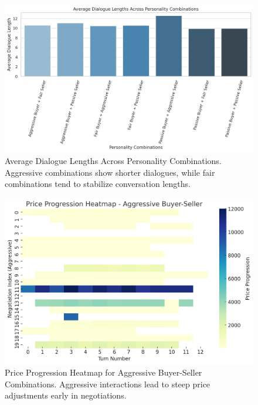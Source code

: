\documentclass[11pt]{article}
\begin{document}
\begin{figure}[h]
    \centering
    \includegraphics[width=1\linewidth]{figures/personality/dialogue_lengths.png}
    \caption{Average Dialogue Lengths Across Personality Combinations. Aggressive combinations show shorter dialogues, while fair combinations tend to stabilize conversation lengths.}
    \label{fig:dialogue_lengths}
\end{figure}

\begin{figure}[h]
    \centering
    \includegraphics[width=1\linewidth]{figures/personality/price_progression_aggressive.png}
    \caption{Price Progression Heatmap for Aggressive Buyer-Seller Combinations. Aggressive interactions lead to steep price adjustments early in negotiations.}
    \label{fig:price_progression_aggressive}
\end{figure}
\end{document}
